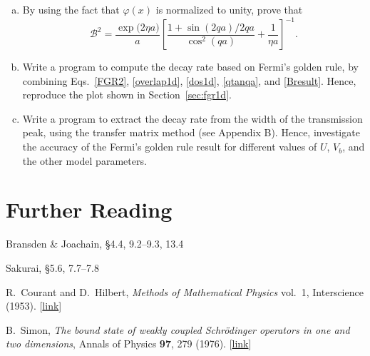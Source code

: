 \documentclass[prx,12pt]{revtex4-2}
\begin{document}
\begin{enumerate}
\begin{enumerate}[(a)]
  \item By using the fact that $\varphi(x)$ is normalized to unity,
    prove that
  \begin{equation}
  \mathcal{B}^2 = \frac{\exp\big(2\eta a\big)}{a} \left[\frac{1+\sin(2qa)/2qa}{\cos^2(qa)}+\frac{1}{\eta a}\right]^{-1}.
  \label{Bresult}
  \end{equation}

\item Write a program to compute the decay rate based on Fermi's
  golden rule, by combining Eqs.~\eqref{FGR2}, \eqref{overlap1d},
  \eqref{dos1d}, \eqref{qtanqa}, and \eqref{Bresult}.  Hence,
  reproduce the plot shown in Section~\ref{sec:fgr1d}.

\item Write a program to extract the decay rate from the width of the
  transmission peak, using the transfer matrix method (see Appendix
  B).  Hence, investigate the accuracy of the Fermi's golden rule
  result for different values of $U$, $V_b$, and the other model
  parameters.

  \end{enumerate}

  





\end{enumerate}




\section*{Further Reading}

\begin{enumerate}[[1{]}]
\item Bransden \& Joachain, \S4.4, 9.2--9.3, 13.4
\item Sakurai, \S5.6, 7.7--7.8

\item R.~Courant and D.~Hilbert, \textit{Methods of Mathematical
  Physics} vol.~1, Interscience (1953).  [\href{https://archive.org/details/MethodsOfMathematicalPhysicsVolume1/page/n337}{link}]
  \label{cite:CourantHilbert}

\item B.~Simon, \textit{The bound state of weakly coupled
  Schr\"odinger operators in one and two dimensions}, Annals of
  Physics \textbf{97}, 279 (1976). [\href{https://doi.org/10.1016/0003-4916(76)90038-5}{link}]
\label{cite:simon}
\end{enumerate}
\end{document}
